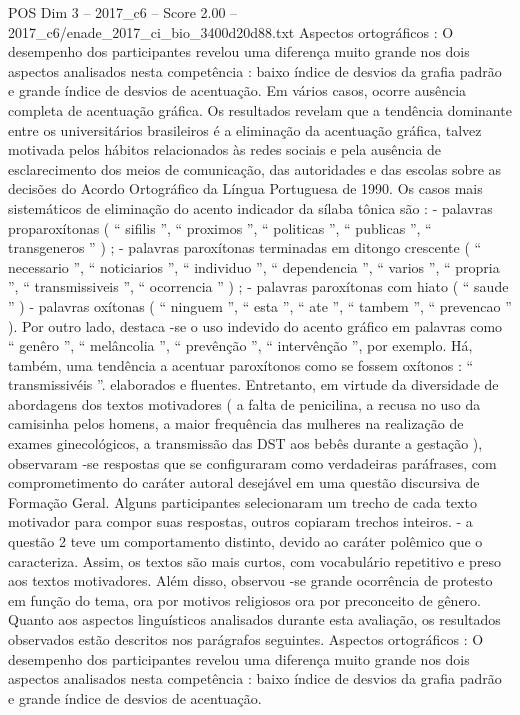 \begin{textsample}{POS Dim 3 – 2017\_c6 – Score 2.00 – 2017\_c6/enade\_2017\_ci\_bio\_3400d20d88.txt}
Aspectos ortográficos : O desempenho dos participantes revelou uma diferença muito grande nos dois aspectos analisados nesta competência : baixo índice de desvios da grafia padrão e grande índice de desvios de acentuação.
Em vários casos, ocorre ausência completa de acentuação gráfica.
Os resultados revelam que a tendência dominante entre os universitários brasileiros é a eliminação da acentuação gráfica, talvez motivada pelos hábitos relacionados às redes sociais e pela ausência de esclarecimento dos meios de comunicação, das autoridades e das escolas sobre as decisões do Acordo Ortográfico da Língua Portuguesa de 1990.
Os casos mais sistemáticos de eliminação do acento indicador da sílaba tônica são : - palavras proparoxítonas ( “ sifilis ”, “ proximos ”, “ politicas ”, “ publicas ”, “ transgeneros ” ) ; - palavras paroxítonas terminadas em ditongo crescente ( “ necessario ”, “ noticiarios ”, “ individuo ”, “ dependencia ”, “ varios ”, “ propria ”, “ transmissiveis ”, “ ocorrencia ” ) ; - palavras paroxítonas com hiato ( “ saude ” ) - palavras oxítonas ( “ ninguem ”, “ esta ”, “ ate ”, “ tambem ”, “ prevencao ” ).
Por outro lado, destaca -se o uso indevido do acento gráfico em palavras como “ genêro ”, “ melâncolia ”, “ prevênção ”, “ intervênção ”, por exemplo.
Há, também, uma tendência a acentuar paroxítonos como se fossem oxítonos : “ transmissivéis ”. elaborados e fluentes.
Entretanto, em virtude da diversidade de abordagens dos textos motivadores ( a falta de penicilina, a recusa no uso da camisinha pelos homens, a maior frequência das mulheres na realização de exames ginecológicos, a transmissão das DST aos bebês durante a gestação ), observaram -se respostas que se configuraram como verdadeiras paráfrases, com comprometimento do caráter autoral desejável em uma questão discursiva de Formação Geral.
Alguns participantes selecionaram um trecho de cada texto motivador para compor suas respostas, outros copiaram trechos inteiros. - a questão 2 teve um comportamento distinto, devido ao caráter polêmico que o caracteriza.
Assim, os textos são mais curtos, com vocabulário repetitivo e preso aos textos motivadores.
Além disso, observou -se grande ocorrência de protesto em função do tema, ora por motivos religiosos ora por preconceito de gênero.
Quanto aos aspectos linguísticos analisados durante esta avaliação, os resultados observados estão descritos nos parágrafos seguintes.
Aspectos ortográficos : O desempenho dos participantes revelou uma diferença muito grande nos dois aspectos analisados nesta competência : baixo índice de desvios da grafia padrão e grande índice de desvios de acentuação.

\end{textsample}
